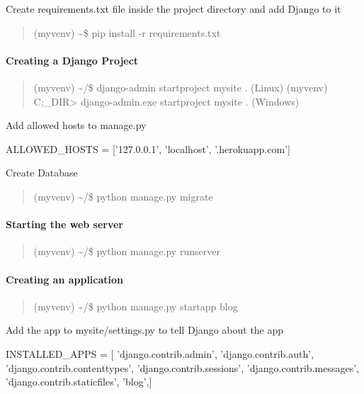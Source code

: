 \documentclass[11pt]{article}
\begin{document}
Create requirements.txt file inside the project directory and add Django
to it

\begin{quote}
(myvenv) \textasciitilde{}\$ pip install -r requirements.txt
\end{quote}

\paragraph{Creating a Django Project}\label{creating-a-django-project}

\begin{quote}
(myvenv) \textasciitilde{}/\$ django-admin startproject mysite . (Linux)
(myvenv) C:\Users\Name\PROJ\_DIR\textgreater{} django-admin.exe
startproject mysite . (Windows)
\end{quote}

Add allowed hosts to manage.py

ALLOWED\_HOSTS = {[}'127.0.0.1', 'localhost', '.herokuapp.com'{]}

Create Database

\begin{quote}
(myvenv) \textasciitilde{}/\$ python manage.py migrate
\end{quote}

\paragraph{Starting the web server}\label{starting-the-web-server}

\begin{quote}
(myvenv) \textasciitilde{}/\$ python manage.py runserver
\end{quote}

\paragraph{Creating an application}\label{creating-an-application}

\begin{quote}
(myvenv) \textasciitilde{}/\$ python manage.py startapp blog
\end{quote}

Add the app to mysite/settings.py to tell Django about the app

INSTALLED\_APPS = {[} 'django.contrib.admin', 'django.contrib.auth',
'django.contrib.contenttypes', 'django.contrib.sessions',
'django.contrib.messages', 'django.contrib.staticfiles', 'blog',{]}
\end{document}
